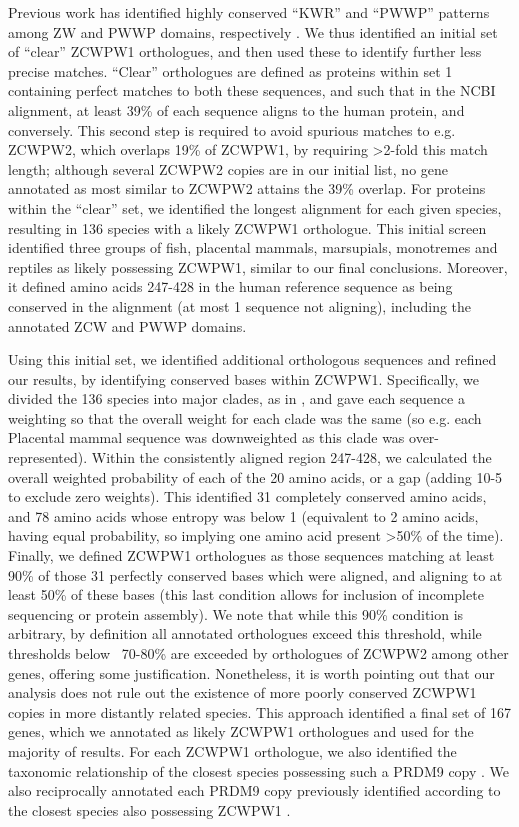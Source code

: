 Previous work has identified highly conserved “KWR” and “PWWP” patterns among ZW and PWWP domains, respectively \parencite{He2010Structural, Qin2014Structure}. We thus identified an initial set of “clear” ZCWPW1 orthologues, and then used these to identify further less precise matches. “Clear” orthologues are defined as proteins within set 1 containing perfect matches to both these sequences, and such that in the NCBI alignment, at least 39\% of each sequence aligns to the human protein, and conversely. This second step is required to avoid spurious matches to e.g. ZCWPW2, which overlaps 19\% of ZCWPW1, by requiring >2-fold this match length; although several ZCWPW2 copies are in our initial list, no gene annotated as most similar to ZCWPW2 attains the 39\% overlap. For proteins within the “clear” set, we identified the longest alignment for each given species, resulting in 136 species with a likely ZCWPW1 orthologue. This initial screen identified three groups of fish, placental mammals, marsupials, monotremes and reptiles as likely possessing ZCWPW1, similar to our final conclusions. Moreover, it defined amino acids 247-428 in the human reference sequence as being conserved in the alignment (at most 1 sequence not aligning), including the annotated ZCW and PWWP domains.

Using this initial set, we identified additional orthologous sequences and refined our results, by identifying conserved bases within ZCWPW1. Specifically, we divided the 136 species into major clades, as in \parencite{Baker2017Repeated}, and gave each sequence a weighting so that the overall weight for each clade was the same (so e.g. each Placental mammal sequence was downweighted as this clade was over-represented). Within the consistently aligned region 247-428, we calculated the overall weighted probability of each of the 20 amino acids, or a gap (adding 10-5 to exclude zero weights). This identified 31 completely conserved amino acids, and 78 amino acids whose entropy was below 1 (equivalent to 2 amino acids, having equal probability, so implying one amino acid present >50\% of the time). Finally, we defined ZCWPW1 orthologues as those sequences matching at least 90\% of those 31 perfectly conserved bases which were aligned, and aligning to at least 50\% of these bases (this last condition allows for inclusion of incomplete sequencing or protein assembly). We note that while this 90\% condition is arbitrary, by definition all annotated orthologues exceed this threshold, while thresholds below ~70-80\% are exceeded by orthologues of ZCWPW2 among other genes, offering some justification. Nonetheless, it is worth pointing out that our analysis does not rule out the existence of more poorly conserved ZCWPW1 copies in more distantly related species. This approach identified a final set of 167 genes, which we annotated as likely ZCWPW1 orthologues and used for the majority of results. For each ZCWPW1 orthologue, we also identified the taxonomic relationship of the closest species possessing such a PRDM9 copy \iffalse(Supplementary Table 1)\fi. We also reciprocally annotated each PRDM9 copy previously identified \parencite{Baker2017Repeated} according to the closest species also possessing ZCWPW1 \iffalse(Supplementary Table 1)\fi.

